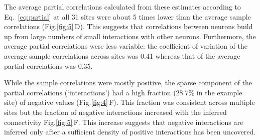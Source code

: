 \documentclass[10pt]{article}
\newcommand{\sq}[1]{\lq#1\rq}
\newcommand{\figref}[2]{Fig.\;\ref{fig:#1}\,#2}
\begin{document}
The average partial correlations calculated from these estimates according to Eq.~\ref{eq:partial} at all 31 sites were about 5 times lower than the average sample correlations (\figref{5}{D}). This suggests that correlations between neurons build up from large numbers of small interactions with other neurons. Furthermore, the average partial correlations were less variable: the coefficient of variation of the average sample correlations across sites was 0.41 whereas that of the average partial correlations was 0.35. 

While the sample correlations were mostly positive, the sparse component of the partial correlations (\sq{interactions}) had a high fraction (28.7\% in the example site) of negative values (\figref{4}{F}). This fraction was consistent across multiple sites but the fraction of negative interactions increased with the inferred connectivity \figref{5}{F}.  This increase suggests that negative interactions are inferred only after a sufficient density of positive interactions has been uncovered.
\end{document}
